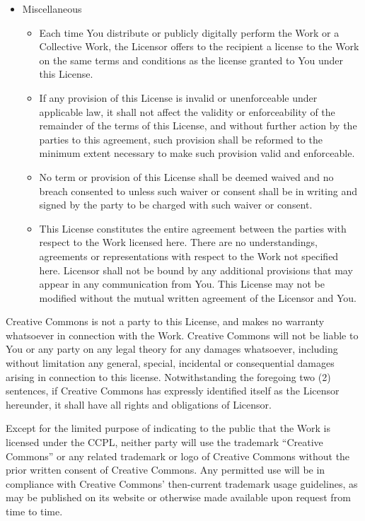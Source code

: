 \begin{itemize}
\item Miscellaneous

\begin{itemize} \item Each time You distribute or publicly digitally
perform the Work or a Collective Work, the Licensor offers to the
recipient a license to the Work on the same terms and conditions as
the license granted to You under this License.

\item If any provision of this License is invalid or unenforceable
under applicable law, it shall not affect the validity or
enforceability of the remainder of the terms of this License, and
without further action by the parties to this agreement, such
provision shall be reformed to the minimum extent necessary to make
such provision valid and enforceable.

\item No term or provision of this License shall be deemed waived and
no breach consented to unless such waiver or consent shall be in
writing and signed by the party to be charged with such waiver or
consent.

\item This License constitutes the entire agreement between the parties
with respect to the Work licensed here.  There are no understandings,
agreements or representations with respect to the Work not specified
here.  Licensor shall not be bound by any additional provisions that
may appear in any communication from You.  This License may not be
modified without the mutual written agreement of the Licensor and
You.\end{itemize} \end{itemize}

Creative Commons is not a party to this License, and makes no warranty
whatsoever in connection with the Work.  Creative Commons will not be
liable to You or any party on any legal theory for any damages
whatsoever, including without limitation any general, special,
incidental or consequential damages arising in connection to this
license.  Notwithstanding the foregoing two (2) sentences, if Creative
Commons has expressly identified itself as the Licensor hereunder, it
shall have all rights and obligations of Licensor.

Except for the limited purpose of indicating to the public that the
Work is licensed under the CCPL, neither party will use the trademark
``Creative Commons'' or any related trademark or logo of Creative
Commons without the prior written consent of Creative Commons.  Any
permitted use will be in compliance with Creative Commons'
then-current trademark usage guidelines, as may be published on its
website or otherwise made available upon request from time to time.


